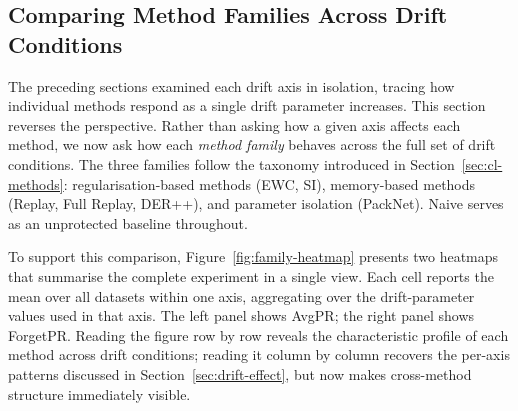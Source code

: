 \subsection{Comparing Method Families Across Drift Conditions}
\label{sec:method-families}

The preceding sections examined each drift axis in isolation, tracing how individual methods respond as a single drift parameter increases. This section reverses the perspective. Rather than asking how a given axis affects each method, we now ask how each \textit{method family} behaves across the full set of drift conditions. The three families follow the taxonomy introduced in Section~\ref{sec:cl-methods}: regularisation-based methods (EWC, SI), memory-based methods (Replay, Full Replay, DER++), and parameter isolation (PackNet). Naive serves as an unprotected baseline throughout.

To support this comparison, Figure~\ref{fig:family-heatmap} presents two heatmaps that summarise the complete experiment in a single view. Each cell reports the mean over all datasets within one axis, aggregating over the drift-parameter values used in that axis. The left panel shows AvgPR; the right panel shows ForgetPR. Reading the figure row by row reveals the characteristic profile of each method across drift conditions; reading it column by column recovers the per-axis patterns discussed in Section~\ref{sec:drift-effect}, but now makes cross-method structure immediately visible.
